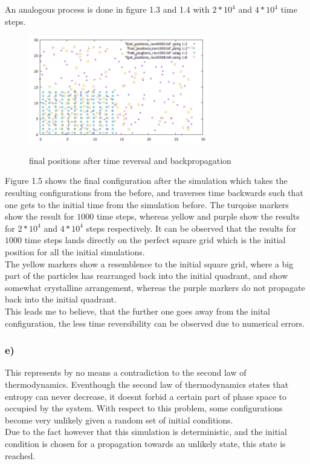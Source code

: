 \documentclass[12pt,a4paper]{article}	%
\begin{document}
An analogous process is done in figure 1.3 and 1.4 with $2*10^4$ and $4*10^4$ time steps. 
\newpage

\begin{figure}[h!]	
\centering
{\includegraphics[width=0.7\textwidth]{final_positions_rev.png}}		
\caption{final positions after time reversal and backpropagation}
\end{figure}

Figure 1.5 shows the final configuration after the simulation which takes the resulting configurations from the before, and traverses time backwards such that one gets to the initial time from the simulation before. The turqoise markers show the result for $1000$ time steps, whereas yellow and purple show the results for $2*10^4$ and $4*10^4$ steps respectively. It can be observed that the results for $1000$ time steps lands directly on the perfect square grid which is the initial position for all the initial simulations.\\
The yellow markers show a resemblence to the initial square grid, where a big part of the particles has rearranged back into the initial quadrant, and show somewhat crystalline arrangement, whereas the purple markers do not propagate back into the initial quadrant. \\

This leads me to believe, that the further one goes away from the inital configuration, the less time reversibility can be observed due to numerical errors. 
\subsubsection*{e)}
This represents by no means a contradiction to the second law of thermodynamics. Eventhough the second law of thermodynamics states that entropy can never decrease, it doesnt forbid a certain part of phase space to occupied by the system. With respect to this problem, some configurations become very unlikely given a random set of initial conditions. \\
Due to the fact however that this simulation is deterministic, and the initial condition is chosen for a propagation towards an unlikely state, this state is reached. \\
\end{document}
